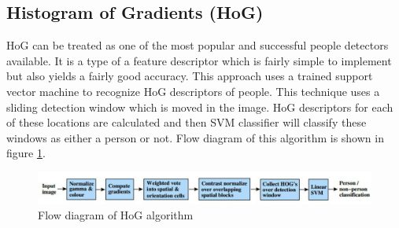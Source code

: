 \documentclass[12pt,a4paper]{report}
\begin{document}
\subsection{Histogram of Gradients (HoG)}
HoG can be treated as one of the most popular and successful people detectors available. It is a type of a feature descriptor which is fairly simple to implement but also yields a fairly good accuracy. 
This approach uses a trained support vector machine to recognize HoG descriptors of people. This technique uses a sliding detection window which is moved in the image. HoG descriptors for each of these locations are calculated and then SVM classifier will classify these windows as either a person or not. Flow diagram of this algorithm is shown in figure \ref{hog}.
\begin{figure}[H]
\includegraphics[width=14cm]{hog.jpg}
\centering
\caption{Flow diagram of HoG algorithm}
\label{hog}
\end{figure}
\end{document}
